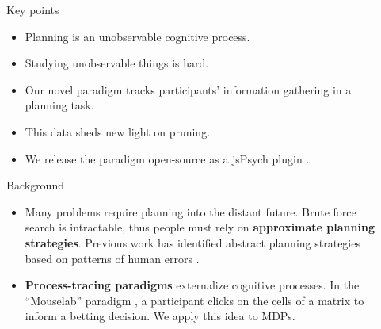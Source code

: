 \documentclass[final]{beamer}
\newlength{\sepwid}
\newlength{\onecolwid}
\begin{document}
\begin{frame}[t, fragile] %
\begin{columns}[t] %
\begin{column}{\sepwid}\end{column} %


\begin{column}{\onecolwid} %
  \begin{block}{Key points}\label{contribution}
    \begin{itemize}
      \item Planning is an unobservable cognitive process.
      \item Studying unobservable things is hard.
      \item Our novel paradigm tracks participants' information gathering in a planning task.
      \item This data sheds new light on pruning.
      \item We release the paradigm open-source as a jsPsych plugin \cite{DeLeeuw2015}.
    \end{itemize}
  \end{block}


  \begin{block}{Background}\label{Background}
    \begin{itemize}
      \item Many problems require planning into the distant future.
            Brute force search is intractable, thus people must rely on \textbf{approximate planning strategies}.
            Previous work has identified abstract planning strategies based on patterns of human errors \cite{Huys2015}.
      \item \textbf{Process-tracing paradigms} externalize cognitive processes.
            In the ``Mouselab'' paradigm \cite{Payne1988}, a participant clicks on the cells of a matrix to inform a betting decision. We apply this idea to MDPs.
    \end{itemize}


\end{block}
\end{column}
\end{columns}
\end{frame}
\end{document}
